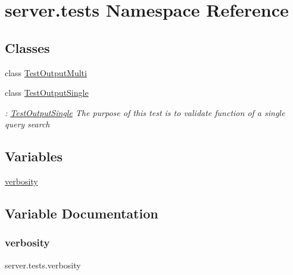 \hypertarget{namespaceserver_1_1tests}{}\section{server.\+tests Namespace Reference}
\label{namespaceserver_1_1tests}
\subsection*{Classes}
\begin{DoxyCompactItemize}
\item 
class \mbox{\hyperlink{classserver_1_1tests_1_1_test_output_multi}{Test\+Output\+Multi}}
\item 
class \mbox{\hyperlink{classserver_1_1tests_1_1_test_output_single}{Test\+Output\+Single}}
\begin{DoxyCompactList}\small\item\em \+: \mbox{\hyperlink{classserver_1_1tests_1_1_test_output_single}{Test\+Output\+Single}} The purpose of this test is to validate function of a single query search \end{DoxyCompactList}\end{DoxyCompactItemize}
\subsection*{Variables}
\begin{DoxyCompactItemize}
\item 
\mbox{\hyperlink{namespaceserver_1_1tests_a4d8f7b15d77348dfadbf5cf0e3a26a81}{verbosity}}
\end{DoxyCompactItemize}


\subsection{Variable Documentation}
\mbox{\label{namespaceserver_1_1tests_a4d8f7b15d77348dfadbf5cf0e3a26a81}} 
\subsubsection{\texorpdfstring{verbosity}{verbosity}}
{\footnotesize\ttfamily server.\+tests.\+verbosity}

